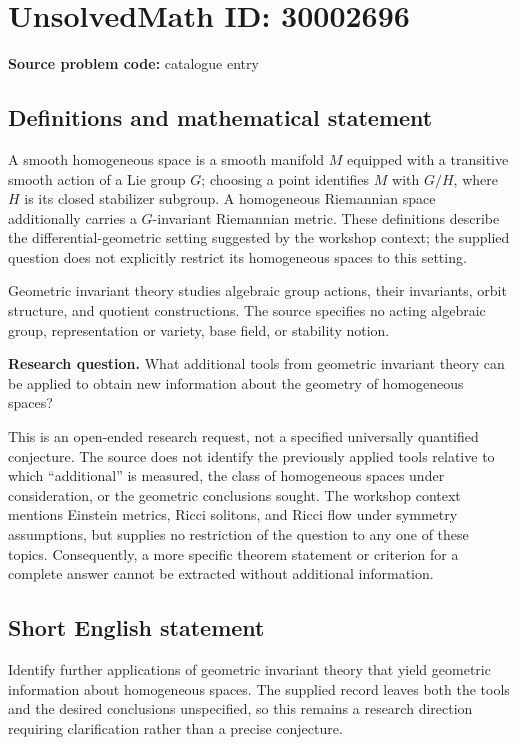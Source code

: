 \documentclass[11pt]{article}
\begin{document}
\section*{UnsolvedMath ID: 30002696}
\textbf{Source problem code:} catalogue entry
\subsection{Definitions and mathematical statement}
A smooth homogeneous space is a smooth manifold \(M\) equipped with a transitive smooth action of a Lie group \(G\); choosing a point identifies \(M\) with \(G/H\), where \(H\) is its closed stabilizer subgroup. A homogeneous Riemannian space additionally carries a \(G\)-invariant Riemannian metric. These definitions describe the differential-geometric setting suggested by the workshop context; the supplied question does not explicitly restrict its homogeneous spaces to this setting.

Geometric invariant theory studies algebraic group actions, their invariants, orbit structure, and quotient constructions. The source specifies no acting algebraic group, representation or variety, base field, or stability notion.

\textbf{Research question.} What additional tools from geometric invariant theory can be applied to obtain new information about the geometry of homogeneous spaces?

This is an open-ended research request, not a specified universally quantified conjecture. The source does not identify the previously applied tools relative to which ``additional'' is measured, the class of homogeneous spaces under consideration, or the geometric conclusions sought. The workshop context mentions Einstein metrics, Ricci solitons, and Ricci flow under symmetry assumptions, but supplies no restriction of the question to any one of these topics. Consequently, a more specific theorem statement or criterion for a complete answer cannot be extracted without additional information.
\subsection{Short English statement}
Identify further applications of geometric invariant theory that yield geometric information about homogeneous spaces. The supplied record leaves both the tools and the desired conclusions unspecified, so this remains a research direction requiring clarification rather than a precise conjecture.
\end{document}
